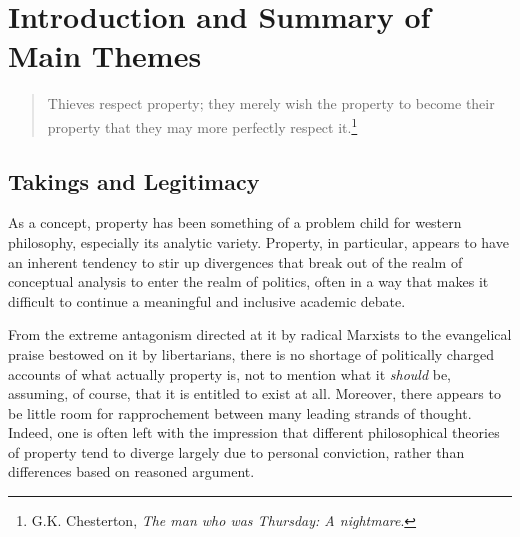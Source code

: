 \chapter{Introduction and Summary of Main Themes}\label{chap:intro}

\begin{quote}
Thieves respect property; they merely wish the property to become their property that they may more perfectly respect it.\footnote{G.K. Chesterton, {\it The man who was Thursday: A nightmare}.}
\end{quote}
%
%
%
\section{Takings and Legitimacy}

As a concept, property has been something of a problem child for western philosophy, especially its analytic variety. Property, in particular, appears to have an inherent tendency to stir up divergences that break out of the realm of conceptual analysis to enter the realm of politics, often in a way that makes it difficult to continue a meaningful and inclusive academic debate.

From the extreme antagonism directed at it by radical Marxists to the evangelical praise bestowed on it by libertarians, there is no shortage of politically charged accounts of what actually property is, not to mention what it {\it should} be, assuming, of course, that it is entitled to exist at all. 
Moreover, there appears to be little room for rapprochement between many leading strands of thought. Indeed, one is often left with the impression that different philosophical theories of property tend to diverge largely due to personal conviction, rather than differences based on reasoned argument. %


